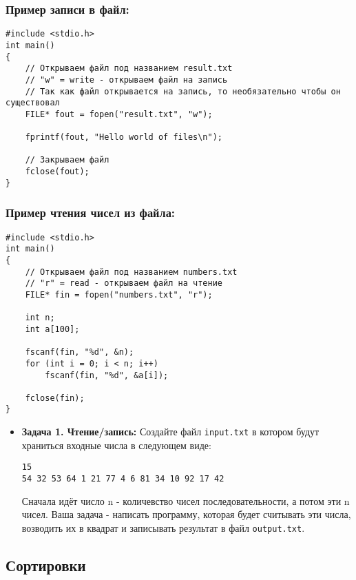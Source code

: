 \documentclass{article}
\begin{document}
\subsubsection*{Пример записи в файл:}
\begin{lstlisting}
#include <stdio.h>
int main()
{
	// Открываем файл под названием result.txt
	// "w" = write - открываем файл на запись
	// Так как файл открывается на запись, то необязательно чтобы он существовал
	FILE* fout = fopen("result.txt", "w");
	
	fprintf(fout, "Hello world of files\n");	
		
	// Закрываем файл
	fclose(fout);
}
\end{lstlisting}
\subsubsection*{Пример чтения чисел из файла:}
\begin{lstlisting}
#include <stdio.h>
int main()
{
	// Открываем файл под названием numbers.txt
	// "r" = read - открываем файл на чтение
	FILE* fin = fopen("numbers.txt", "r");
	
	int n;
	int a[100];
	
	fscanf(fin, "%d", &n);
	for (int i = 0; i < n; i++)
		fscanf(fin, "%d", &a[i]);	
		
	fclose(fin);
}
\end{lstlisting}

\begin{itemize}
\item \textbf{Задача 1. Чтение/запись:} Создайте файл \texttt{input.txt} в котором будут храниться входные числа в следующем виде:
\begin{lstlisting}
15
54 32 53 64 1 21 77 4 6 81 34 10 92 17 42
\end{lstlisting}
Сначала идёт число n - количевство чисел последовательности, а потом эти n чисел. Ваша задача - написать программу, которая будет считывать эти числа, возводить их в квадрат и записывать результат в файл \texttt{output.txt}.
\end{itemize}
\newpage

\subsection{Сортировки}
\end{document}
